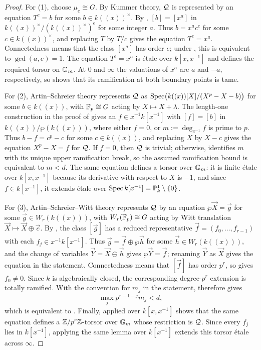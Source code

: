 \begin{proof}
For (1), choose $\mu_e\cong G$. By Kummer theory, $\mathcal{Q}$ is represented by
an equation $T^e=b$ for some $b\in k((x))^\times$. By
, $[b]=[x^a]$ in
$k((x))^\times/(k((x))^\times)^e$ for some integer $a$. Thus
$b=x^ac^e$ for some $c\in k((x))^\times$, and replacing $T$ by $T/c$
gives the equation $T^e=x^a$. Connectedness means that the class $[x^a]$
has order $e$; under , this is equivalent
to $\gcd(a,e)=1$.
The equation $T^e=x^a$ is \'etale over $k[x,x^{-1}]$
and defines the required torsor on $\mathbb{G}_m$. At $0$ and $\infty$ the
valuations of $x^a$ are $a$ and $-a$, respectively, so
 shows that its ramification at both
boundary points is tame.

For (2), Artin--Schreier theory represents $\mathcal{Q}$ as
$\operatorname{Spec}\bigl(k((x))[X]/(X^p-X-b)\bigr)$ for some $b\in k((x))$, with
$\mathbb{F}_p\cong G$ acting by $X\mapsto X+\lambda$. The length-one construction
in the proof of  gives an
$f\in x^{-1}k[x^{-1}]$ with $[f]=[b]$ in $k((x))/\wp(k((x)))$, where
either $f=0$, or $m:=\deg_{x^{-1}}f$ is prime to $p$. Thus
$b-f=c^p-c$ for some $c\in k((x))$, and replacing $X$ by $X-c$ gives the
equation $X^p-X=f$ for $\mathcal{Q}$. If $f=0$, then $\mathcal{Q}$ is trivial; otherwise,
 identifies $m$ with its unique
upper ramification break, so the assumed ramification bound is equivalent
to $m<d$. The same equation defines a torsor over $\mathbb{G}_m$: it is finite
\'etale over $k[x,x^{-1}]$ because its derivative with respect to $X$ is
$-1$, and since $f\in k[x^{-1}]$, it extends \'etale over
$\operatorname{Spec} k[x^{-1}]=\mathbb{P}^1_k\setminus\{0\}$.

For (3), Artin--Schreier--Witt theory represents $\mathcal{Q}$ by an equation
$\wp\vec X=\vec g$ for some $\vec g\in W_r(k((x)))$, with
$W_r(\mathbb{F}_p)\cong G$ acting by Witt translation
$\vec X\mapsto\vec X\oplus\vec c$. By
, the class $[\vec g]$ has a
reduced representative $\vec f=(f_0,\dots,f_{r-1})$ with each
$f_j\in x^{-1}k[x^{-1}]$. Thus
$\vec g=\vec f\oplus\wp\vec h$ for some $\vec h\in W_r(k((x)))$, and the
change of variables $\vec Y=\vec X\ominus\vec h$ gives
$\wp\vec Y=\vec f$; renaming $\vec Y$ as $\vec X$ gives the equation in the
statement. Connectedness means that $[\vec f]$ has order $p^r$, so
 gives $f_0\neq0$. Since $k$
is algebraically closed, the corresponding degree-$p^r$ extension is totally
ramified. With the convention for $m_j$ in the statement,
 therefore gives
\[
\max_j p^{r-1-j}m_j<d,
\]
which is equivalent to . Finally,
 applied over $k[x,x^{-1}]$ shows that the same
equation defines a $\mathbb{Z}/p^r\mathbb{Z}$-torsor over $\mathbb{G}_m$ whose restriction is
$\mathcal{Q}$. Since every $f_j$ lies in $k[x^{-1}]$, applying the same lemma over
$k[x^{-1}]$ extends this torsor \'etale across $\infty$.
\end{proof}

